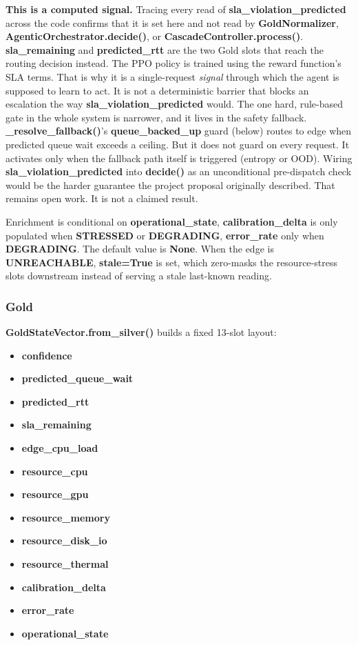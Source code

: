 \textbf{This is a computed signal.}
Tracing every read of \textbf{sla\_violation\_predicted} across the code 
confirms that it is set here and not read by \textbf{GoldNormalizer},
 \textbf{AgenticOrchestrator.decide()}, or \textbf{CascadeController.process()}.
\textbf{sla\_remaining} and \textbf{predicted\_rtt} are the two Gold slots
that reach the routing decision instead. The PPO policy is trained using the reward
function's SLA terms. That is why it is a single-request \emph{signal} through
which the agent is supposed to learn to act. It is not a deterministic
barrier that blocks an escalation the way \textbf{sla\_violation\_predicted}
would. The one hard, rule-based gate in the whole system is narrower, and
it lives in the safety fallback. \textbf{\_resolve\_fallback()}'s
\textbf{queue\_backed\_up} guard (below) routes to edge when predicted
queue wait exceeds a ceiling. But it does not guard on every request.
It activates only when the fallback path itself is triggered (entropy or OOD).
Wiring \textbf{sla\_violation\_predicted} into \textbf{decide()} as an
unconditional pre-dispatch check would be the harder guarantee the
project proposal originally described. That remains open work. It is
not a claimed result.

Enrichment is conditional on \textbf{operational\_state},
\textbf{calibration\_delta} is only populated when \textbf{STRESSED} or
\textbf{DEGRADING}, \textbf{error\_rate} only when \textbf{DEGRADING}.
The default value is \textbf{None}. When the edge is
\textbf{UNREACHABLE}, \textbf{stale=True} is set, which zero-masks the
resource-stress slots downstream instead of serving a stale last-known
reading.

\hypertarget{gold}{%
\subsubsection{Gold}\label{gold}}

\textbf{GoldStateVector.from\_silver()} builds a fixed 13-slot layout:

\begin{samepage}
\begin{itemize}
\item[0.] \textbf{confidence}
\item[1.] \textbf{predicted\_queue\_wait}
\item[2.] \textbf{predicted\_rtt}
\item[3.] \textbf{sla\_remaining}
\item[4.] \textbf{edge\_cpu\_load}
\item[5.] \textbf{resource\_cpu}
\item[6.] \textbf{resource\_gpu}
\item[7.] \textbf{resource\_memory}
\item[8.] \textbf{resource\_disk\_io}
\item[9.] \textbf{resource\_thermal}
\item[10.] \textbf{calibration\_delta}
\item[11.] \textbf{error\_rate}
\item[12.] \textbf{operational\_state}
\end{itemize}
\end{samepage}

